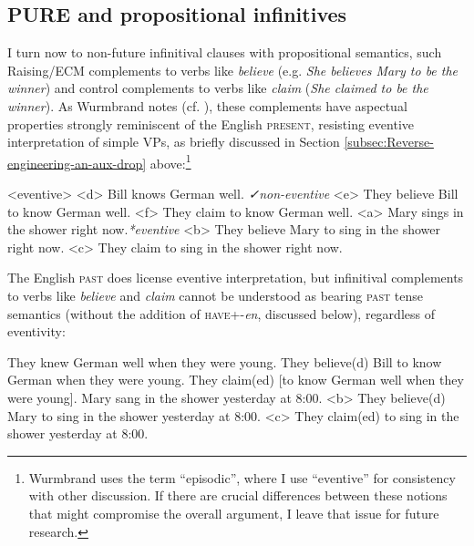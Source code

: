 \documentclass[output=paper]{langscibook}
\begin{document}
\subsection{PURE and propositional infinitives}

I turn now to non-future infinitival clauses with propositional semantics, such Raising/ECM complements to verbs like \textit{believe} (e.g. \textit{She believes Mary to be the winner})\textit{ }and control complements to verbs like \textit{claim} (\textit{She claimed to be the winner}). As Wurmbrand notes (cf. \citealt{Pesetsky1991}), these complements have aspectual properties strongly reminiscent of the English \textsc{present, }resisting eventive interpretation of simple VPs, as briefly discussed in Section \ref{subsec:Reverse-engineering-an-aux-drop} above:\footnote{Wurmbrand uses the term “episodic”, where I use “eventive” for consistency with other discussion. If there are crucial differences between these notions that might compromise the overall argument, I leave that issue for future research.}

\pex<eventive>
\a<d> Bill knows German well. \tabto{3in}\textit{✓non-eventive}
\a<e> They believe Bill to know German well. 
\a<f> They claim to know German well.
\vspace{.5\baselineskip}
\a[label=d]<a> \ljudge*Mary sings in the shower right now.\tabto{3in}\textit{*eventive}
\a[label=e]<b> \ljudge*They believe Mary to sing in the shower right now.
\a[label=f]<c> \ljudge*They claim to sing in the shower right now.
\xe

\noindent The English \textsc{past} does license eventive interpretation, but infinitival complements to verbs like \textit{believe }and \textit{claim }cannot be understood as bearing \textsc{past }tense semantics (without the addition of \textsc{have}+-\textit{en}, discussed below), regardless of eventivity:

\a They knew German well when they were young.
\a \ljudge*They believe(d) Bill to know German when they were young.
\a \ljudge*They claim(ed) [to know German well when they were young].
\vspace{.5\baselineskip}
\a Mary sang in the shower yesterday at 8:00.
\a<b> \ljudge*They believe(d) Mary to sing in the shower yesterday at 8:00.
\a<c> \ljudge*They claim(ed) to sing in the shower yesterday at 8:00.
\xe
\end{document}
